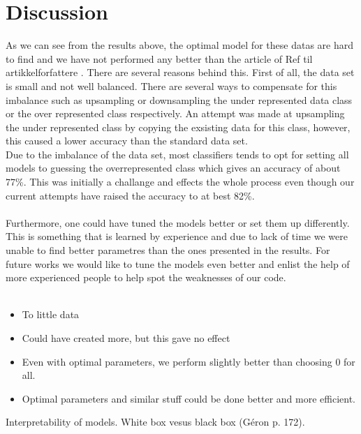 \documentclass[12pt]{article}
\numberwithin{figure}{section}
\newcommand{\husk}[1]{\color{red} #1 \color{black}}
\begin{document}
\section{Discussion}
As we can see from the results above, the optimal model for these datas are hard to find and we have not performed any better than the article of \husk{Ref til artikkelforfattere}. There are several reasons behind this. First of all, the data set is small and not well balanced. There are several ways to compensate for this imbalance such as upsampling or downsampling the under represented data class or the over represented class respectively. An attempt was made at upsampling the under represented class by copying the exsisting data for this class, however, this caused a lower accuracy than the standard data set. \\ 
Due to the imbalance of the data set, most classifiers tends to opt for setting all models to guessing the overrepresented class which gives an accuracy of about 77\%. This was initially a challange and effects the whole process even though our current attempts have raised the accuracy to at best 82\%.\\ \\
Furthermore, one could have tuned the models better or set them up differently. This is something that is learned by experience and due to lack of time we were unable to find better parametres than the ones presented in the results. For future works we would like to tune the models even better and enlist the help of more experienced people to help spot the weaknesses of our code. \\ \\

\begin{itemize}
\item To little data
\item Could have created more, but this gave no effect
\item Even with optimal parameters, we perform slightly better than choosing 0 for all.
\item Optimal parameters and similar stuff could be done better and more efficient.
\end{itemize}
Interpretability of models. White box vesus black box (Géron p. 172).
\end{document}
